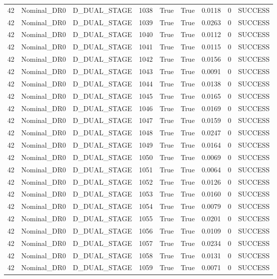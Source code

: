 \documentclass[11pt,a4paper,oneside]{book}
\begin{document}
\begin{longtable}{l l l l l l l l l}
42 & Nominal\_DR0 & D\_DUAL\_STAGE & 1038 & True & True & 0.0118 & 0 & SUCCESS \\
42 & Nominal\_DR0 & D\_DUAL\_STAGE & 1039 & True & True & 0.0263 & 0 & SUCCESS \\
42 & Nominal\_DR0 & D\_DUAL\_STAGE & 1040 & True & True & 0.0112 & 0 & SUCCESS \\
42 & Nominal\_DR0 & D\_DUAL\_STAGE & 1041 & True & True & 0.0115 & 0 & SUCCESS \\
42 & Nominal\_DR0 & D\_DUAL\_STAGE & 1042 & True & True & 0.0156 & 0 & SUCCESS \\
42 & Nominal\_DR0 & D\_DUAL\_STAGE & 1043 & True & True & 0.0091 & 0 & SUCCESS \\
42 & Nominal\_DR0 & D\_DUAL\_STAGE & 1044 & True & True & 0.0138 & 0 & SUCCESS \\
42 & Nominal\_DR0 & D\_DUAL\_STAGE & 1045 & True & True & 0.0165 & 0 & SUCCESS \\
42 & Nominal\_DR0 & D\_DUAL\_STAGE & 1046 & True & True & 0.0169 & 0 & SUCCESS \\
42 & Nominal\_DR0 & D\_DUAL\_STAGE & 1047 & True & True & 0.0159 & 0 & SUCCESS \\
42 & Nominal\_DR0 & D\_DUAL\_STAGE & 1048 & True & True & 0.0247 & 0 & SUCCESS \\
42 & Nominal\_DR0 & D\_DUAL\_STAGE & 1049 & True & True & 0.0164 & 0 & SUCCESS \\
42 & Nominal\_DR0 & D\_DUAL\_STAGE & 1050 & True & True & 0.0069 & 0 & SUCCESS \\
42 & Nominal\_DR0 & D\_DUAL\_STAGE & 1051 & True & True & 0.0064 & 0 & SUCCESS \\
42 & Nominal\_DR0 & D\_DUAL\_STAGE & 1052 & True & True & 0.0126 & 0 & SUCCESS \\
42 & Nominal\_DR0 & D\_DUAL\_STAGE & 1053 & True & True & 0.0160 & 0 & SUCCESS \\
42 & Nominal\_DR0 & D\_DUAL\_STAGE & 1054 & True & True & 0.0079 & 0 & SUCCESS \\
42 & Nominal\_DR0 & D\_DUAL\_STAGE & 1055 & True & True & 0.0201 & 0 & SUCCESS \\
42 & Nominal\_DR0 & D\_DUAL\_STAGE & 1056 & True & True & 0.0109 & 0 & SUCCESS \\
42 & Nominal\_DR0 & D\_DUAL\_STAGE & 1057 & True & True & 0.0234 & 0 & SUCCESS \\
42 & Nominal\_DR0 & D\_DUAL\_STAGE & 1058 & True & True & 0.0131 & 0 & SUCCESS \\
42 & Nominal\_DR0 & D\_DUAL\_STAGE & 1059 & True & True & 0.0071 & 0 & SUCCESS \\

\end{longtable}
\end{document}

